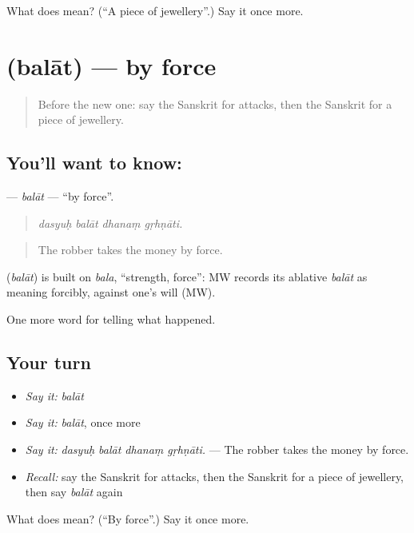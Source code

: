 \begin{tcolorbox}[breakable,colback=teal!4,colframe=teal!35!black,title={Before you move on}]
What does  mean? (\textquotedblleft{}A piece of jewellery\textquotedblright{}.) Say it once more.
\end{tcolorbox}
\section[\texorpdfstring{\sk{बलात्} (balāt)}{बलात् (balāt)}]{ (balāt) — by force}

\label{lesson:SA-C290-balat}



\begin{quote}
Before the new one: say the Sanskrit for attacks, then the Sanskrit for a piece of jewellery.
\end{quote}

\subsection*{You'll want to know: }
\textbf{} — \emph{balāt} — \textquotedblleft{}by force\textquotedblright{}.

\begin{quote}
   
\end{quote}

\begin{quote}
\emph{dasyuḥ balāt dhanaṃ gṛhṇāti.}
\end{quote}

\begin{quote}
The robber takes the money by force.
\end{quote}

\begin{cousinweb}
\textbf{} (\emph{balāt}) is built on \emph{bala}, \textquotedblleft{}strength, force\textquotedblright{}: MW records its ablative \emph{balāt} as meaning forcibly, against one's will (MW).
\end{cousinweb}

\begin{grammarlens}[title={What you've built}]
One more word for telling what happened.
\end{grammarlens}

\subsection*{Your turn}
\begin{itemize}
\raggedright
  \item \emph{Say it:} \emph{balāt}
  \item \emph{Say it:} \emph{balāt}, once more
  \item \emph{Say it:} \emph{dasyuḥ balāt dhanaṃ gṛhṇāti.} — The robber takes the money by force.
  \item \emph{Recall:} say the Sanskrit for attacks, then the Sanskrit for a piece of jewellery, then say \emph{balāt} again
\end{itemize}

\begin{tcolorbox}[breakable,colback=teal!4,colframe=teal!35!black,title={Before you move on}]
What does  mean? (\textquotedblleft{}By force\textquotedblright{}.) Say it once more.
\end{tcolorbox}
